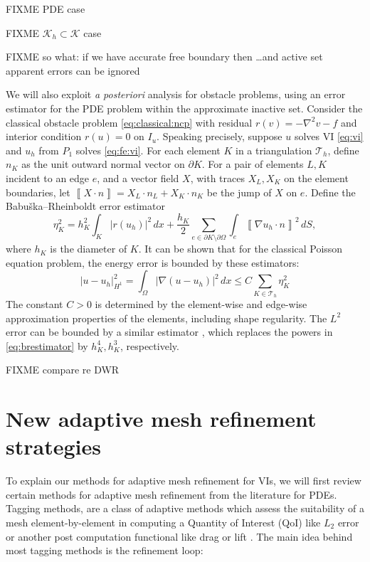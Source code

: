\documentclass[]{interact}
\theoremstyle{plain}%
\theoremstyle{definition}
\theoremstyle{remark}
\newcommand{\grad}{\nabla}
\newcommand{\cK}{\mathcal{K}}
\newcommand{\cT}{\mathcal{T}}
\begin{document}
FIXME PDE case

FIXME $\cK_h\subset \cK$ case

FIXME so what: if we have accurate free boundary then \dots and active set apparent errors can be ignored

We will also exploit \emph{a posteriori} analysis for obstacle problems, using an error estimator for the PDE problem within the approximate inactive set.  Consider the classical obstacle problem \eqref{eq:classical:ncp} with residual $r(v)=-\nabla^2 v - f$ and interior condition $r(u) = 0$ on $I_u$.  Speaking precisely, suppose $u$ solves VI \eqref{eq:vi} and $u_h$ from $P_1$ solves \eqref{eq:fe:vi}.  For each element $K$ in a triangulation $\cT_h$, define $n_K$ as the unit outward normal vector on $\partial K$.  For a pair of elements $L,K$ incident to an edge $e$, and a vector field $X$, with traces $X_L,X_K$ on the element boundaries, let $\left\llbracket X \cdot n \right\rrbracket = X_L \cdot n_L + X_K \cdot n_K$ be the jump of $X$ on $e$.  Define the Babu\v{s}ka--Rheinboldt \cite{BabuskaRheinboldt1979} error estimator
\begin{equation} \label{eq:brestimator}
\eta_K^2 = h_K^2 \int_K |r(u_h)|^2\,dx + \frac{h_K}{2} \sum_{e \in \partial K \setminus \partial \Omega} \int_{e} \left\llbracket \grad u_h \cdot n \right\rrbracket^2\,dS,
\end{equation}
where $h_K$ is the diameter of $K$.  It can be shown \cite[section 3.2]{AinsworthOden1997} that for the classical Poisson equation problem, the energy error is bounded by these estimators:
\begin{equation} \label{eq:brbound}
|u-u_h|_{H^1}^2 = \int_\Omega |\grad(u-u_h)|^2\,dx \le C \sum_{K\in\cT_h} \eta_K^2
\end{equation}
The constant $C>0$ is determined by the element-wise and edge-wise approximation properties of the elements, including shape regularity.  The $L^2$ error can be bounded by a similar estimator \cite[section 3.3]{AinsworthOden1997}, which replaces the powers in \eqref{eq:brestimator} by $h_K^4,h_K^3$, respectively.

FIXME compare \cite{Suttmeier2008} re DWR


\section{New adaptive mesh refinement strategies} \label{sec:viamr}

To explain our methods for adaptive mesh refinement for VIs, we will first review certain methods for adaptive mesh refinement from the literature for PDEs.  Tagging methods, are a class of adaptive methods which assess the suitability of a mesh element-by-element in computing a Quantity of Interest (QoI) like $L_2$ error or another post computation functional like drag or lift \cite{BangerthRannacher2003}. The main idea behind most tagging methods is the refinement loop:
\end{document}
